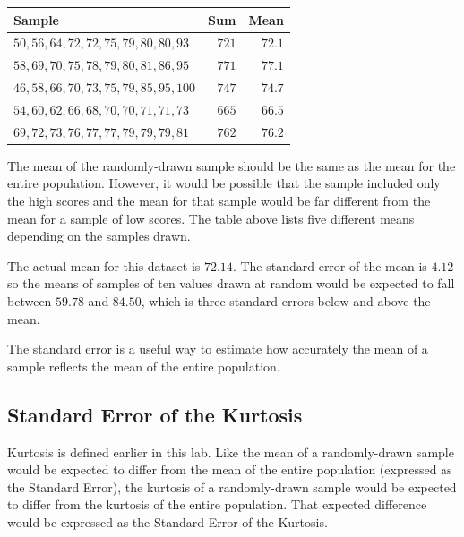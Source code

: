 \begin{table}[H]
  \sffamily
  \begin{center}
    \begin{tabular}{|l|r|r|}
      \hline 
      Sample & Sum & Mean \\ 
      \hline 
      $ 50, 56, 64, 72, 72, 75, 79, 80, 80, 93 $ & $ 721 $ & $ 72.1 $ \\ 
      \hline 
      $ 58, 69, 70, 75, 78, 79, 80, 81, 86, 95 $ & $ 771 $ & $ 77.1 $ \\ 
      \hline 
      $ 46, 58, 66, 70, 73, 75, 79, 85, 95, 100 $ & $ 747 $ & $ 74.7 $ \\ 
      \hline 
      $ 54, 60, 62, 66, 68, 70, 70, 71, 71, 73 $ & $ 665 $ & $ 66.5 $ \\ 
      \hline 
      $ 69, 72, 73, 76, 77, 77, 79, 79, 79, 81 $ & $ 762 $ & $ 76.2 $ \\ 
      \hline 
    \end{tabular} 
  \end{center}
\end{table}

The mean of the randomly-drawn sample should be the same as the mean for the entire population. However, it would be possible that the sample included only the high scores and the mean for that sample would be far different from the mean for a sample of low scores. The table above lists five different means depending on the samples drawn.

The actual mean for this dataset is $ 72.14 $. The standard error of the mean is $ 4.12 $ so the means of samples of ten values drawn at random would be expected to fall between $ 59.78 $ and $ 84.50 $, which is three standard errors below and above the mean.

The standard error is a useful way to estimate how accurately the mean of a sample reflects the mean of the entire population.

\subsection{Standard Error of the Kurtosis}\label{lab03_standard_error_of_the_kurt}

Kurtosis is defined earlier in this lab. Like the mean of a randomly-drawn sample would be expected to differ from the mean of the entire population (expressed as the Standard Error), the kurtosis of a randomly-drawn sample would be expected to differ from the kurtosis of the entire population. That expected difference would be expressed as the Standard Error of the Kurtosis.

